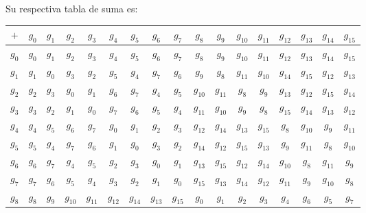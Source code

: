 \documentclass[letterpaper,11pt]{article}
\begin{document}
\begin{enumerate}
    
    Su respectiva tabla de suma es:
    \begin{table}[h]
    \begin{center}
    \begin{tabular}{|c|c|c|c|c|c|c|c|c|c|c|c|c|c|c|c|c|}
    \hline
    $+$ & $g_{0}$ & $g_{1}$ & $g_{2}$ & $g_{3}$ & $g_{4}$ & $g_{5}$ & $g_{6}$ &
    $g_{7}$ & $g_{8}$ & $g_{9}$ & $g_{10}$ & $g_{11}$ & $g_{12}$ & $g_{13}$ &
    $g_{14}$ & $g_{15}$ \\ \hline
    $g_{0}$ & $g_{0}$ & $g_{1}$ & $g_{2}$ & $g_{3}$ & $g_{4}$ & $g_{5}$ & 
    $g_{6}$ & $g_{7}$ & $g_{8}$ & $g_{9}$ & $g_{10}$ & $g_{11}$ & $g_{12}$ & 
    $g_{13}$ & $g_{14}$ & $g_{15}$  \\ \hline
    $g_{1}$ & $g_{1}$ & $g_{0}$ & $g_{3}$ & $g_{2}$ & $g_{5}$ & $g_{4}$ &  
    $g_{7}$ & $g_{6}$ & $g_{9}$ & $g_{8}$ & $g_{11}$ & $g_{10}$ & $g_{14}$ & 
    $g_{15}$ & $g_{12}$ & $g_{13}$\\ \hline
    $g_{2}$ & $g_{2}$ & $g_{3}$ & $g_{0}$ & $g_{1}$ & $g_{6}$ & $g_{7}$ &
    $g_{4}$ & $g_{5}$ & $g_{10}$ & $g_{11}$ & $g_{8}$ & $g_{9}$ & $g_{13}$ &
    $g_{12}$ & $g_{15}$ & $g_{14}$ \\ \hline
    $g_{3}$ & $g_{3}$ & $g_{2}$ & $g_{1}$ & $g_{0}$ & $g_{7}$ & $g_{6}$ &
    $g_{5}$ & $g_{4}$ & $g_{11}$ & $g_{10}$ & $g_{9}$ & $g_{8}$ & $g_{15}$ &
    $g_{14}$ & $g_{13}$ & $g_{12}$ \\ \hline
    $g_{4}$ & $g_{4}$ & $g_{5}$ & $g_{6}$ & $g_{7}$ & $g_{0}$ & $g_{1}$ &
    $g_{2}$ & $g_{3}$ & $g_{12}$ & $g_{14}$ & $g_{13}$ & $g_{15}$ & $g_{8}$ & 
    $g_{10}$ & $g_{9}$ & $g_{11}$ \\ \hline
    $g_{5}$ & $g_{5}$ & $g_{4}$ & $g_{7}$ & $g_{6}$ & $g_{1}$ & $g_{0}$ & 
    $g_{3}$ & $g_{2}$ & $g_{14}$ & $g_{12}$ & $g_{15}$ & $g_{13}$ & $g_{9}$ &
    $g_{11}$ & $g_{8}$ & $g_{10}$ \\ \hline
    $g_{6}$ & $g_{6}$ & $g_{7}$ & $g_{4}$ & $g_{5}$ & $g_{2}$ & $g_{3}$ & 
    $g_{0}$ & $g_{1}$ & $g_{13}$ & $g_{15}$ & $g_{12}$ & $g_{14}$ & $g_{10}$ & 
    $g_{8}$ & $g_{11}$ & $g_{9}$ \\ \hline
    $g_{7}$ & $g_{7}$ & $g_{6}$ & $g_{5}$ & $g_{4}$ & $g_{3}$ & $g_{2}$ &  
    $g_{1}$ & $g_{0}$ & $g_{15}$ & $g_{13}$ & $g_{14}$ & $g_{12}$ & $g_{11}$ &
    $g_{9}$ & $g_{10}$ & $g_{8}$ \\ \hline
    $g_{8}$ & $g_{8}$ & $g_{9}$ & $g_{10}$ & $g_{11}$ & $g_{12}$ & $g_{14}$ &  
    $g_{13}$ & $g_{15}$ & $g_{0}$ & $g_{1}$ & $g_{2}$ & $g_{3}$ & $g_{4}$ &
    $g_{6}$ & $g_{5}$ & $g_{7}$ \\ \hline

\end{tabular}
\end{center}
\end{table}
\end{enumerate}
\end{document}
